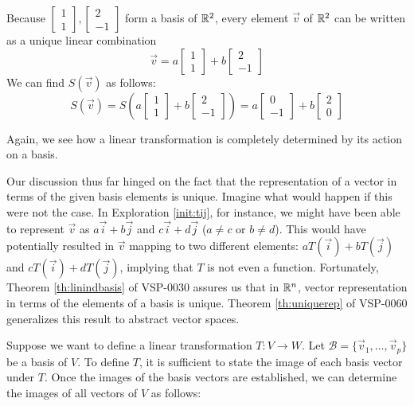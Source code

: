\documentclass{ximera}
\begin{document}
\begin{exploration}
Because $\begin{bmatrix}1\\1\end{bmatrix},\begin{bmatrix}2\\-1\end{bmatrix}$ form a basis of $\mathbb{R}^2$, every element $\vec{v}$ of $\mathbb{R}^2$ can be written as a unique linear combination $$\vec{v}=a\begin{bmatrix}1\\1\end{bmatrix}+b\begin{bmatrix}2\\-1\end{bmatrix}$$
We can find $S(\vec{v})$ as follows:
$$S(\vec{v})=S\left(a\begin{bmatrix}1\\1\end{bmatrix}+b\begin{bmatrix}2\\-1\end{bmatrix}\right)=a\begin{bmatrix}0\\-1\end{bmatrix}+b\begin{bmatrix}2\\0\end{bmatrix}$$

Again, we see how a linear transformation is completely determined by its action on a basis.

\end{exploration}



Our discussion thus far hinged on the fact that the representation of a vector in terms of the given basis elements is unique.  Imagine what would happen if this were not the case.  In Exploration \ref{init:tij}, for instance, we might have been able to represent $\vec{v}$ as $a\vec{i}+b\vec{j}$ and $c\vec{i}+d\vec{j}$ ($a\neq c$ or $b\neq d$).  This would have potentially resulted in $\vec{v}$ mapping to two different elements: $aT(\vec{i})+bT(\vec{j})$ and $cT(\vec{i})+dT(\vec{j})$, implying that $T$ is not even a function.  Fortunately, Theorem \ref{th:linindbasis} of VSP-0030 assures us that in $\mathbb{R}^n$, vector representation in terms of the elements of a basis is unique.  
Theorem \ref{th:uniquerep} of VSP-0060 generalizes this result to abstract vector spaces.

Suppose we want to define a linear transformation $T:V\rightarrow W$.  Let $\mathcal{B}=\{\vec{v}_1,\ldots,\vec{v}_p\}$ be a basis of $V$.  To define $T$, it is sufficient to state the image of each basis vector under $T$.  Once the images of the basis vectors are established, we can determine the images of all vectors of $V$ as follows:
\end{document}
